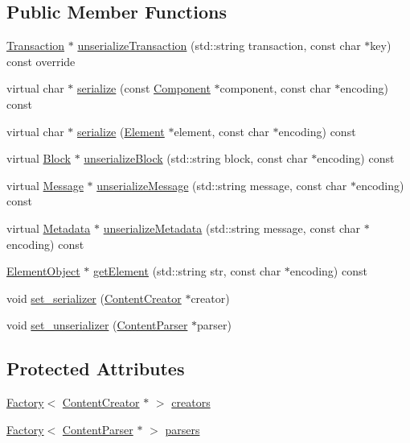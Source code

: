 \subsection*{Public Member Functions}
\begin{DoxyCompactItemize}
\item 
\mbox{\hyperlink{classTransaction}{Transaction}} $\ast$ \mbox{\hyperlink{classCustomSerializer_abff58f1a955c2f399127b7e3cae23223}{unserialize\+Transaction}} (std\+::string transaction, const char $\ast$key) const override
\item 
virtual char $\ast$ \mbox{\hyperlink{classSerializer_a5cfe31eb70f4d0c92f2d68c22f39e885}{serialize}} (const \mbox{\hyperlink{classComponent}{Component}} $\ast$component, const char $\ast$encoding) const
\item 
virtual char $\ast$ \mbox{\hyperlink{classSerializer_a38bec517fb3b3cc0778c75b807cb930c}{serialize}} (\mbox{\hyperlink{classElement}{Element}} $\ast$element, const char $\ast$encoding) const
\item 
virtual \mbox{\hyperlink{classBlock}{Block}} $\ast$ \mbox{\hyperlink{classSerializer_a423fb7c43ca9c23e07000dba0c5a432a}{unserialize\+Block}} (std\+::string block, const char $\ast$encoding) const
\item 
virtual \mbox{\hyperlink{classMessage}{Message}} $\ast$ \mbox{\hyperlink{classSerializer_a1d16df9f35a7580da06a497dfbddffe8}{unserialize\+Message}} (std\+::string message, const char $\ast$encoding) const
\item 
virtual \mbox{\hyperlink{classMetadata}{Metadata}} $\ast$ \mbox{\hyperlink{classSerializer_a64b858f0c2968e888cf796b6f09eed7b}{unserialize\+Metadata}} (std\+::string message, const char $\ast$encoding) const
\item 
\mbox{\hyperlink{classElementObject}{Element\+Object}} $\ast$ \mbox{\hyperlink{classSerializer_ab3bcdbd49167109de13e03878337018a}{get\+Element}} (std\+::string str, const char $\ast$encoding) const
\item 
void \mbox{\hyperlink{classSerializer_aee483f1845ca1b7f7ac4243de9902750}{set\+\_\+serializer}} (\mbox{\hyperlink{classContentCreator}{Content\+Creator}} $\ast$creator)
\item 
void \mbox{\hyperlink{classSerializer_a74ea868b820b4a8472da98c0045418fa}{set\+\_\+unserializer}} (\mbox{\hyperlink{classContentParser}{Content\+Parser}} $\ast$parser)
\end{DoxyCompactItemize}
\subsection*{Protected Attributes}
\begin{DoxyCompactItemize}
\item 
\mbox{\hyperlink{classFactory}{Factory}}$<$ \mbox{\hyperlink{classContentCreator}{Content\+Creator}} $\ast$ $>$ \mbox{\hyperlink{classSerializer_a7d26e865966b304350653b1246ec3340}{creators}}
\item 
\mbox{\hyperlink{classFactory}{Factory}}$<$ \mbox{\hyperlink{classContentParser}{Content\+Parser}} $\ast$ $>$ \mbox{\hyperlink{classSerializer_a96f96c01e6a471513669621751591fd9}{parsers}}
\end{DoxyCompactItemize}


